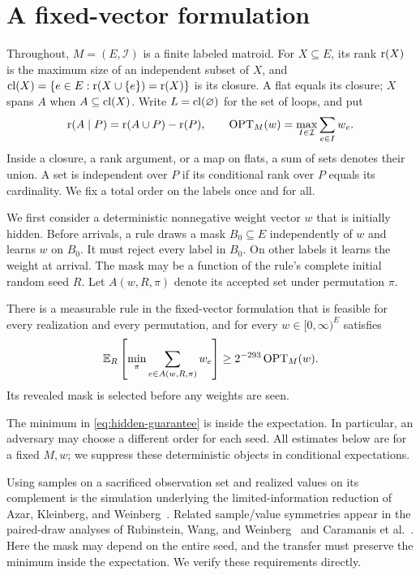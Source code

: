 \section{A fixed-vector formulation}\label{sec:setup}

Throughout, $M=(E,\mathcal I)$ is a finite labeled matroid. For $X\subseteq E$,
its rank $\operatorname{r}(X)$ is the maximum size of an independent subset of $X$, and
$\operatorname{cl}(X)=\{e\in E:\operatorname{r}(X\cup\{e\})=\operatorname{r}(X)\}$ is its closure.
A flat equals its closure; $X$ spans $A$ when $A\subseteq\operatorname{cl}(X)$.
Write $L=\operatorname{cl}(\varnothing)$ for the set of loops, and put
\[
 \operatorname{r}(A\mid P)=\operatorname{r}(A\cup P)-\operatorname{r}(P),\qquad
 \operatorname{OPT}_M(w)=\max_{I\in\mathcal I}\sum_{e\in I}w_e.
\]
Inside a closure, a rank argument, or a map on flats, a sum of sets denotes
their union. A set is independent over $P$ if its conditional rank over $P$
equals its cardinality. We fix a total order on the labels once and for all.

We first consider a deterministic nonnegative weight vector $w$ that is
initially hidden. Before arrivals, a rule draws a mask $B_0\subseteq E$
independently of $w$ and learns $w$ on $B_0$. It must reject every label in
$B_0$. On other labels it learns the weight at arrival. The mask may be a
function of the rule's complete initial random seed $R$. Let
$A(w,R,\pi)$ denote its accepted set under permutation $\pi$.

\begin{proposition}\label{prop:hidden}
There is a measurable rule in the fixed-vector formulation that is feasible for every
realization and every permutation, and for every $w\in[0,\infty)^E$ satisfies
\begin{equation}\label{eq:hidden-guarantee}
 \mathbb E_R\left[\min_{\pi}\sum_{e\in A(w,R,\pi)}w_e\right]
 \ge 2^{-293}\operatorname{OPT}_M(w).
\end{equation}
Its revealed mask is selected before any weights are seen.
\end{proposition}

The minimum in \eqref{eq:hidden-guarantee} is inside the expectation.
In particular, an adversary may choose a different order for each seed.
All estimates below are for a fixed $M,w$; we suppress these deterministic
objects in conditional expectations.

Using samples on a sacrificed observation set and realized values on its
complement is the simulation underlying the limited-information reduction
of Azar, Kleinberg, and Weinberg~\cite[Section 3]{AKW14}. Related
sample/value symmetries appear in the paired-draw analyses of
Rubinstein, Wang, and Weinberg~\cite[Section 3]{RWW20} and Caramanis
et al.~\cite[Sections 2 and 6]{CDF22}. Here the mask may depend on the
entire seed, and the transfer must preserve the minimum inside the
expectation. We verify these requirements directly.

